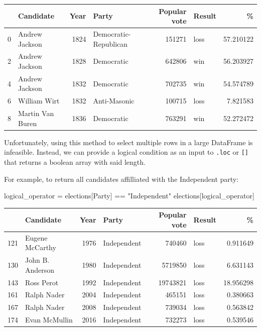 \documentclass[
  letterpaper,
  DIV=11,
  numbers=noendperiod]{scrreprt}
\newenvironment{Shaded}{\begin{snugshade}}{\end{snugshade}}
\newcommand{\NormalTok}[1]{\textcolor[rgb]{0.00,0.23,0.31}{#1}}
\newcommand{\OperatorTok}[1]{\textcolor[rgb]{0.37,0.37,0.37}{#1}}
\newcommand{\StringTok}[1]{\textcolor[rgb]{0.13,0.47,0.30}{#1}}
\begin{document}
\begin{tabular}{llrlrlr}
\toprule
{} &         Candidate &  Year &                  Party &  Popular vote & Result &          \% \\
\midrule
0 &    Andrew Jackson &  1824 &  Democratic-Republican &        151271 &   loss &  57.210122 \\
2 &    Andrew Jackson &  1828 &             Democratic &        642806 &    win &  56.203927 \\
4 &    Andrew Jackson &  1832 &             Democratic &        702735 &    win &  54.574789 \\
6 &      William Wirt &  1832 &           Anti-Masonic &        100715 &   loss &   7.821583 \\
8 &  Martin Van Buren &  1836 &             Democratic &        763291 &    win &  52.272472 \\
\bottomrule
\end{tabular}

Unfortunately, using this method to select multiple rows in a large
DataFrame is infeasible. Instead, we can provide a logical condition as
an input to \texttt{.loc} or \texttt{{[}{]}} that returns a boolean
array with said length.

For example, to return all candidates affilliated with the Independent
party:

\begin{Shaded}
\begin{Highlighting}[]
\NormalTok{logical\_operator }\OperatorTok{=}\NormalTok{ elections[}\StringTok{\textquotesingle{}Party\textquotesingle{}}\NormalTok{] }\OperatorTok{==} \StringTok{"Independent"}
\NormalTok{elections[logical\_operator]}
\end{Highlighting}
\end{Shaded}

\begin{tabular}{llrlrlr}
\toprule
{} &         Candidate &  Year &        Party &  Popular vote & Result &          \% \\
\midrule
121 &   Eugene McCarthy &  1976 &  Independent &        740460 &   loss &   0.911649 \\
130 &  John B. Anderson &  1980 &  Independent &       5719850 &   loss &   6.631143 \\
143 &        Ross Perot &  1992 &  Independent &      19743821 &   loss &  18.956298 \\
161 &       Ralph Nader &  2004 &  Independent &        465151 &   loss &   0.380663 \\
167 &       Ralph Nader &  2008 &  Independent &        739034 &   loss &   0.563842 \\
174 &     Evan McMullin &  2016 &  Independent &        732273 &   loss &   0.539546 \\
\bottomrule
\end{tabular}
\end{document}
